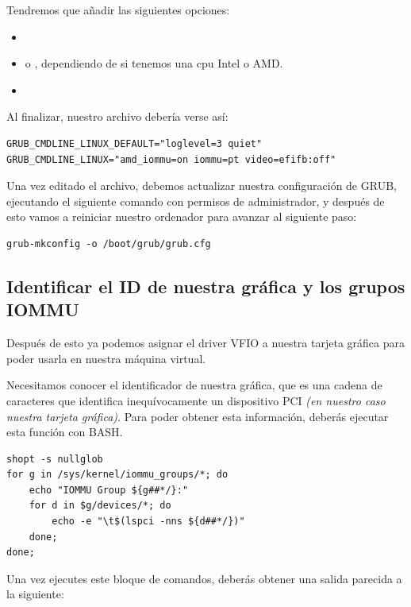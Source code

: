 \documentclass[11pt]{article}
\begin{document}
Tendremos que añadir las siguientes opciones:

\begin{itemize}
\setlength\itemsep{-0.2em}
\item {}
\item {} o , dependiendo de si tenemos una cpu Intel o AMD.
\item {}
\end{itemize}

Al finalizar, nuestro archivo debería verse así:

\begin{verbatim}
GRUB_CMDLINE_LINUX_DEFAULT="loglevel=3 quiet"
GRUB_CMDLINE_LINUX="amd_iommu=on iommu=pt video=efifb:off"
\end{verbatim}

Una vez editado el archivo, debemos actualizar nuestra configuración de GRUB, ejecutando el siguiente comando con permisos de administrador, y después de esto vamos a reiniciar nuestro ordenador para avanzar al siguiente paso:

\begin{verbatim}
grub-mkconfig -o /boot/grub/grub.cfg
\end{verbatim}

\subsection{Identificar el ID de nuestra gráfica y los grupos IOMMU}

Después de esto ya podemos asignar el driver VFIO a nuestra tarjeta gráfica para poder usarla en nuestra máquina virtual.

\vspace{5pt}

Necesitamos conocer el identificador de nuestra gráfica, que es una cadena de caracteres que identifica inequívocamente un dispositivo PCI \textit{(en nuestro caso nuestra tarjeta gráfica)}. Para poder obtener esta información, deberás ejecutar esta función con BASH.

\begin{verbatim}
shopt -s nullglob
for g in /sys/kernel/iommu_groups/*; do
    echo "IOMMU Group ${g##*/}:"
    for d in $g/devices/*; do
        echo -e "\t$(lspci -nns ${d##*/})"
    done;
done;
\end{verbatim}

Una vez ejecutes este bloque de comandos, deberás obtener una salida parecida a la siguiente:
\end{document}
